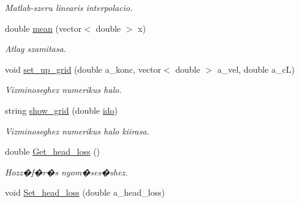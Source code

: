 \begin{DoxyCompactItemize}
\begin{DoxyCompactList}\small\item\em Matlab-\/szeru linearis interpolacio. \end{DoxyCompactList}\item 
double \hyperlink{class_agelem_a126c41d23c78c6d5a81feafd6829e236}{mean} (vector$<$ double $>$ x)\hypertarget{class_agelem_a126c41d23c78c6d5a81feafd6829e236}{}\label{class_agelem_a126c41d23c78c6d5a81feafd6829e236}

\begin{DoxyCompactList}\small\item\em Atlag szamitasa. \end{DoxyCompactList}\item 
void \hyperlink{class_agelem_a144892d0f79ad876bcdb3fe70e282edf}{set\+\_\+up\+\_\+grid} (double a\+\_\+konc, vector$<$ double $>$ a\+\_\+vel, double a\+\_\+cL)\hypertarget{class_agelem_a144892d0f79ad876bcdb3fe70e282edf}{}\label{class_agelem_a144892d0f79ad876bcdb3fe70e282edf}

\begin{DoxyCompactList}\small\item\em Vizminoseghez numerikus halo. \end{DoxyCompactList}\item 
string \hyperlink{class_agelem_a1500c8131aaa82f6150193a8cf13050b}{show\+\_\+grid} (double \hyperlink{class_agelem_a0cdf382c62ac004b8a120319be0cea84}{ido})\hypertarget{class_agelem_a1500c8131aaa82f6150193a8cf13050b}{}\label{class_agelem_a1500c8131aaa82f6150193a8cf13050b}

\begin{DoxyCompactList}\small\item\em Vizminoseghez numerikus halo kiirasa. \end{DoxyCompactList}\item 
double \hyperlink{class_agelem_a9c448326eb07e271b4e2dc8a9dd2a0d9}{Get\+\_\+head\+\_\+loss} ()\hypertarget{class_agelem_a9c448326eb07e271b4e2dc8a9dd2a0d9}{}\label{class_agelem_a9c448326eb07e271b4e2dc8a9dd2a0d9}

\begin{DoxyCompactList}\small\item\em Hozz�f�r�s nyom�ses�shez. \end{DoxyCompactList}\item 
void \hyperlink{class_agelem_a3ff5a59abe058d7b4b6812962e291fc1}{Set\+\_\+head\+\_\+loss} (double a\+\_\+head\+\_\+loss)\hypertarget{class_agelem_a3ff5a59abe058d7b4b6812962e291fc1}{}\label{class_agelem_a3ff5a59abe058d7b4b6812962e291fc1}


\end{DoxyCompactItemize}
